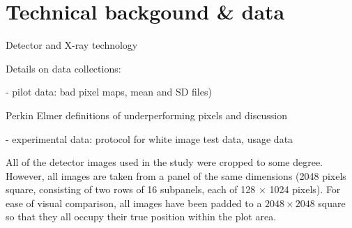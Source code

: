 \documentclass[../../IO-Pixels.tex]{subfiles}
\begin{document}
\section{Technical backgound \& data}
\begin{outline}
Detector and X-ray technology

Details on data collections: 

- pilot data: bad pixel maps, mean and SD files)

  Perkin Elmer definitions of underperforming pixels and discussion
  
- experimental data: protocol for white image test data, usage data
\end{outline}

All of the detector images used in the study were cropped to some degree. However, all images are taken from a panel of the same dimensions (2048 pixels square, consisting of two rows of 16 subpanels, each of 128 $\times$ 1024 pixels). For ease of visual comparison, all images have been padded to a $2048 \times 2048$ square so that they all occupy their true position within the plot area.
  
\end{document}
